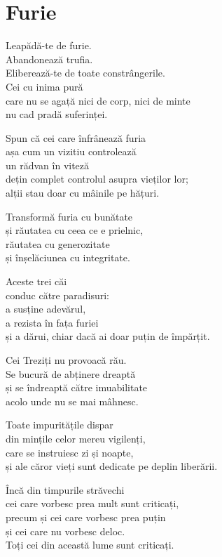 
\chapter{Furie}


Leapădă-te de furie.\\
Abandonează trufia.\\
Eliberează-te de toate constrângerile.\\
Cei cu inima pură\\
care nu se agață nici de corp, nici de minte\\
nu cad pradă suferinței.


Spun că cei care înfrânează furia\\
așa cum un vizitiu controlează\\
un rădvan în viteză\\
dețin complet controlul asupra vieților lor;\\
alții stau doar cu mâinile pe hățuri.


Transformă furia cu bunătate\\
și răutatea cu ceea ce e prielnic,\\
răutatea cu generozitate\\
și înșelăciunea cu integritate.


Aceste trei căi\\
conduc către paradisuri:\\
a susține adevărul,\\
a rezista în fața furiei\\
și a dărui, chiar dacă ai doar puțin de împărțit.


Cei Treziți nu provoacă rău.\\
Se bucură de abținere dreaptă\\
și se îndreaptă către imuabilitate\\
acolo unde nu se mai mâhnesc.


Toate impuritățile dispar\\
din mințile celor mereu vigilenți,\\
care se instruiesc zi și noapte,\\
și ale căror vieți sunt dedicate pe deplin liberării.


Încă din timpurile străvechi\\
cei care vorbesc prea mult sunt criticați,\\
precum și cei care vorbesc prea puțin\\
și cei care nu vorbesc deloc.\\
Toți cei din această lume sunt criticați.


